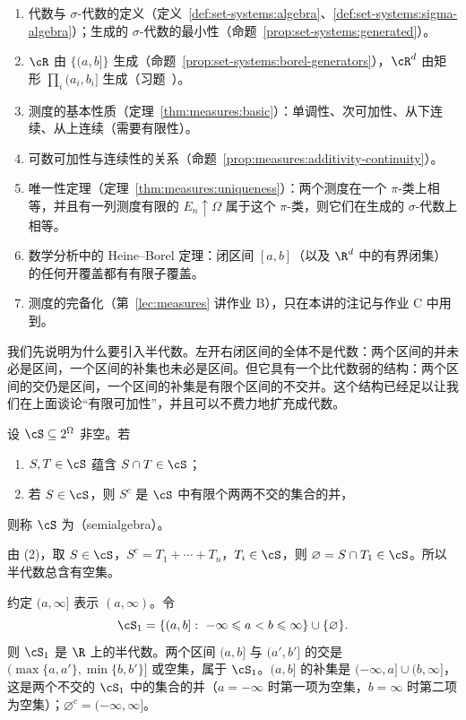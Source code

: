 \begin{enumerate}
\item 代数与 $\sigma$-代数的定义（定义~\ref{def:set-systems:algebra}、\ref{def:set-systems:sigma-algebra}）；生成的 $\sigma$-代数的最小性（命题~\ref{prop:set-systems:generated}）。
\item $\cR$ 由 $\{(a,b]\}$ 生成（命题~\ref{prop:set-systems:borel-generators}），$\cR^d$ 由矩形 $\prod_i(a_i,b_i]$ 生成（习题~）。
\item 测度的基本性质（定理~\ref{thm:measures:basic}）：单调性、次可加性、从下连续、从上连续（需要有限性）。
\item 可数可加性与连续性的关系（命题~\ref{prop:measures:additivity-continuity}）。
\item 唯一性定理（定理~\ref{thm:measures:uniqueness}）：两个测度在一个 $\pi$-类上相等，并且有一列测度有限的 $E_n\uparrow\Omega$ 属于这个 $\pi$-类，则它们在生成的 $\sigma$-代数上相等。
\item 数学分析中的 Heine--Borel 定理：闭区间 $[a,b]$（以及 $\R^d$ 中的有界闭集）的任何开覆盖都有有限子覆盖。
\item 测度的完备化（第~\ref{lec:measures} 讲作业 B），只在本讲的注记与作业 C 中用到。
\end{enumerate}


我们先说明为什么要引入半代数。左开右闭区间的全体不是代数：两个区间的并未必是区间，一个区间的补集也未必是区间。但它具有一个比代数弱的结构：两个区间的交仍是区间，一个区间的补集是有限个区间的不交并。这个结构已经足以让我们在上面谈论“有限可加性”，并且可以不费力地扩充成代数。

\begin{definition}[半代数]\label{def:extension:semialgebra}
设 $\cS\subseteq2^\Omega$ 非空。若
\begin{enumerate}
\item $S,T\in\cS$ 蕴含 $S\cap T\in\cS$；
\item 若 $S\in\cS$，则 $S^c$ 是 $\cS$ 中有限个两两不交的集合的并，
\end{enumerate}
则称 $\cS$ 为（semialgebra）。
\end{definition}

由 (2)，取 $S\in\cS$，$S^c=T_1+\cdots+T_n$，$T_i\in\cS$，则 $\varnothing=S\cap T_1\in\cS$。所以半代数总含有空集。

\begin{example}[左开右闭区间]\label{ex:extension:S1}
约定 $(a,\infty]$ 表示 $(a,\infty)$。令
\[
\cS_1=\{(a,b]:\ -\infty\leqslant a<b\leqslant\infty\}\cup\{\varnothing\}.
\]
则 $\cS_1$ 是 $\R$ 上的半代数。两个区间 $(a,b]$ 与 $(a',b']$ 的交是 $(\max\{a,a'\},\min\{b,b'\}]$ 或空集，属于 $\cS_1$。$(a,b]$ 的补集是 $(-\infty,a]\cup(b,\infty]$，这是两个不交的 $\cS_1$ 中的集合的并（$a=-\infty$ 时第一项为空集，$b=\infty$ 时第二项为空集）；$\varnothing^c=(-\infty,\infty]$。
\end{example}

